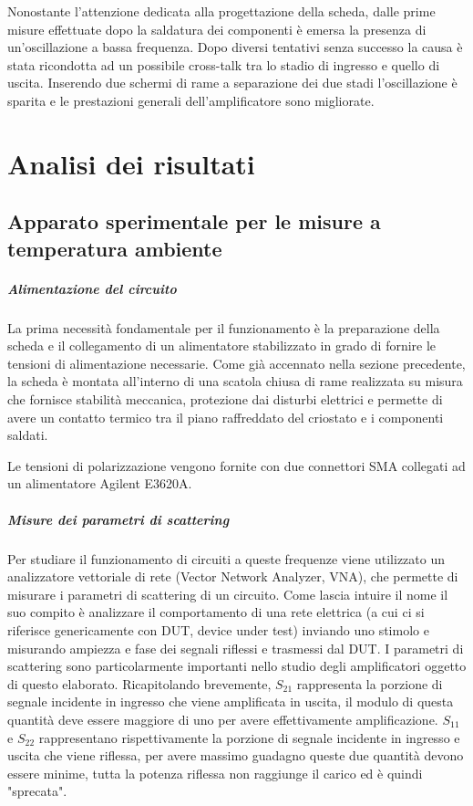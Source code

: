 \documentclass[12pt,oneside]{book}
\begin{document}
Nonostante l'attenzione dedicata alla progettazione della scheda, dalle prime misure effettuate dopo la saldatura dei componenti è emersa la presenza di un'oscillazione a bassa frequenza. Dopo diversi tentativi senza successo la causa è stata ricondotta ad un possibile cross-talk tra lo stadio di ingresso e quello di uscita. Inserendo due schermi di rame a separazione dei due stadi l'oscillazione è sparita e le prestazioni generali dell'amplificatore sono migliorate.

\chapter{Analisi dei risultati}
\label{sect_results}

\section{Apparato sperimentale per le misure a temperatura ambiente}
\paragraph{Alimentazione del circuito}
La prima necessità fondamentale per il funzionamento è la preparazione della scheda e il collegamento di un alimentatore stabilizzato in grado di fornire le tensioni di alimentazione necessarie.
Come già accennato nella sezione precedente, la scheda è montata all'interno di una scatola chiusa di rame realizzata su misura che fornisce stabilità meccanica, protezione dai disturbi elettrici e permette di avere un contatto termico tra il piano raffreddato del criostato e i componenti saldati.

Le tensioni di polarizzazione vengono fornite con due connettori SMA collegati ad un alimentatore Agilent E3620A.

\paragraph{Misure dei parametri di scattering} 
Per studiare il funzionamento di circuiti a queste frequenze viene utilizzato un analizzatore vettoriale di rete (Vector Network Analyzer, VNA), che permette di misurare i parametri di scattering di un circuito. Come lascia intuire il nome il suo compito è analizzare il comportamento di una rete elettrica (a cui ci si riferisce genericamente con DUT, device under test) inviando uno stimolo e misurando ampiezza e fase dei segnali riflessi e trasmessi dal DUT. I parametri di scattering sono particolarmente importanti nello studio degli amplificatori oggetto di questo elaborato. Ricapitolando brevemente, $S_{21}$ rappresenta la porzione di segnale incidente in ingresso che viene amplificata in uscita, il modulo di questa quantità deve essere maggiore di uno per avere effettivamente amplificazione. $S_{11}$ e $S_{22}$ rappresentano rispettivamente la porzione di segnale incidente in ingresso e uscita che viene riflessa, per avere massimo guadagno queste due quantità devono essere minime, tutta la potenza riflessa non raggiunge il carico ed è quindi "sprecata".
\end{document}
